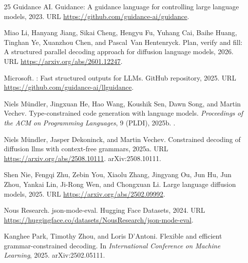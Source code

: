 \documentclass{article}
\begin{document}
\begin{thebibliography}{25}
{Guidance AI}.
\newblock Guidance: A guidance language for controlling large language models,
  2023.
\newblock URL \url{https://github.com/guidance-ai/guidance}.

Miao Li, Hanyang Jiang, Sikai Cheng, Hengyu Fu, Yuhang Cai, Baihe Huang,
  Tinghan Ye, Xuanzhou Chen, and Pascal~Van Hentenryck.
\newblock Plan, verify and fill: A structured parallel decoding approach for
  diffusion language models, 2026.
\newblock URL \url{https://arxiv.org/abs/2601.12247}.

{Microsoft}.
: Fast structured outputs for {LLM}s.
\newblock GitHub repository, 2025.
\newblock URL \url{https://github.com/guidance-ai/llguidance}.

Niels M{\"u}ndler, Jingxuan He, Hao Wang, Koushik Sen, Dawn Song, and Martin
  Vechev.
\newblock Type-constrained code generation with language models.
\newblock \emph{Proceedings of the ACM on Programming Languages}, 9
  (PLDI), 2025b.
\newblock {}.

Niels Mündler, Jasper Dekoninck, and Martin Vechev.
\newblock Constrained decoding of diffusion llms with context-free grammars,
  2025a.
\newblock URL \url{https://arxiv.org/abs/2508.10111}.
\newblock arXiv:2508.10111.

Shen Nie, Fengqi Zhu, Zebin You, Xiaolu Zhang, Jingyang Ou, Jun Hu, Jun Zhou,
  Yankai Lin, Ji-Rong Wen, and Chongxuan Li.
\newblock Large language diffusion models, 2025.
\newblock URL \url{https://arxiv.org/abs/2502.09992}.

{Nous Research}.
\newblock json-mode-eval.
\newblock Hugging Face Datasets, 2024.
\newblock URL
  \url{https://huggingface.co/datasets/NousResearch/json-mode-eval}.

Kanghee Park, Timothy Zhou, and Loris D'Antoni.
\newblock Flexible and efficient grammar-constrained decoding.
\newblock In \emph{International Conference on Machine Learning}, 2025.
\newblock arXiv:2502.05111.


\end{thebibliography}
\end{document}
